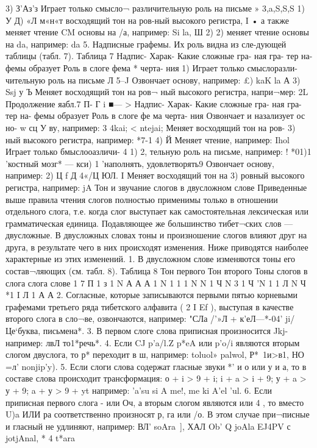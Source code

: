 3)	З’Аз’з	Играет только смысло¬
различительную роль на письме
»	3,a,S,S,S	1) У Д) «Л м«н«т
восходящий тон на ров-ный высокого регистра,
I
•	а также меняет чтение
CM	основы на /а, например:
Si la, Ш
2)	 	2) меняет чтение основы
на da, например:   da
5.	Надписные графемы. Их роль видна из сле-дующей таблицы (табл. 7).
Таблица 7
Надпис- Харак- Какие сложные гра-
ная гра- тер на- фемы образует	Роль в слоге
фема * черта-
	ния	
1)	Играет только смыслоразли-
чительную роль на письме
Л	
 	5--J	Озвончает основу, например:
£) kaK   la А
3) Ssj     у Ъ{	Меняет восходящий тон на ров¬
ный высокого регистра, напри¬мер: 2L
Продолжение яабл.7
П-	Г		 	i 	 ■— >
Надпис- Харак- Какие сложные гра-
ная гра- тер на- фемы образует	Роль в слоге
фе ма черта-
		 ния		
Озвончает и назализует ос но-
w сц У	ву, например: 3  4kai; < ntejai;
Меняет восходящий тон на ров-
3)	 	ный высокого регистра, например:
*7-1
4)	Й	Меняет чтение, например:
Ihol
Играет только бмыслооазличи-
 4	1)	    2,   тельную роль на письме, например:
!	*01)1 'костный мозг* —
кси) 1 'наполнять, удовлетворять9
Озвончает основу, например:
2)	Ц f   Д	4«/Ц ЮЛ.
I Меняет восходящий тон на
3)	ровный	высокого регистра,
например:   jA
Тон и звучание слогов в двусложном слове Приведенные выше правила чтения слогов полностью применимы только в отношении отдельного слога, т.е. когда слог выступает как самостоятельная лексическая или грамматическая единица. Подавляющее же большинство тибет¬ских слов --- двусложные. В двусложных словах тоны и произношение слогов влияют друг на друга, в результате чего в них происходят изменения. Ниже приводятся наиболее характерные из этих изменений.
1.	В двусложном слове изменяются тоны его состав¬ляющих (см. табл. 8).
Таблица 8
Тон первого	Тон второго Тоны слогов в
слога	слога	слове
1	7	П
1	з	1	N
	А	А	А 1
N	1	1	1
N	N	1	Ч
N	3	1	Ч
'N	1	 1
Л	N	 Ч
*1 I Л 1 А А
2.	Согласные, которые записываются первыми пятью корневыми графемами третьего ряда тибетского алфавита
(	  2    I Ef ), выступая в качестве второго слога в сло¬ве, озвончаются, например: "СЛа /'»Л +	к’еЛ—*-04'
ji/Це‘буква, письмена*.
3.	В первом слоге слова приписная произносится Jkj-например:	лвЛ то1*речь*.
4.	Если CJ p’a/l.Z  p*eA или p’o/i являются вторым слогом двуслога, то р* переходит в ш, например:
  toluol»	  palwol,	Р*~1и>в1, НО =л'
  nonjip'y).
5.	Если слоги слова содержат гласные звуки *' и о или у и а, то в составе слова происходит трансформация: о + i > 9 + i; i + a > i + 9; у + a > у + 9; a + у > 9 + yt например:
'a'su si A me!,	me ki   A’el ’ul.
6.	Если приписная первого слога -   или Оч, а вторым слогом являются   или  4 , то вместо U)a ИЛИ ра соответственно произносят р, га или /о. В этом случае при¬писные   и гласный не удлиняют, например: ВЛ'   soAra~], ХАЛ Ob' Q joAla EJ4PV с jotjAnal,   * 4 t*ara
}
